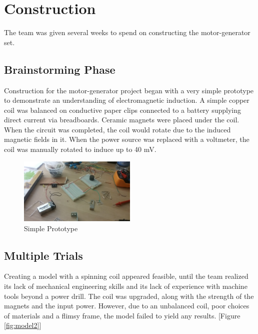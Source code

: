 \section{Construction}
The team was given several weeks to spend on constructing the motor-generator set.

    \subsection{Brainstorming Phase}
    Construction for the motor-generator project began with a very simple prototype to demonstrate an understanding of electromagnetic induction. A simple copper coil was balanced on conductive paper clips connected to a battery supplying direct current via breadboards. Ceramic magnets were placed under the coil. When the circuit was completed, the coil would rotate due to the induced magnetic fields in it. When the power source was replaced with a voltmeter, the coil was manually rotated to induce up to 40 mV.

    \begin{figure}[!ht]
        \begin{center}
            \includegraphics[width=0.5\textwidth]{figures/models/1.jpg}
        \end{center} \caption{Simple Prototype} \label{fig:model1}
    \end{figure}

    \subsection{Multiple Trials}
    Creating a model with a spinning coil appeared feasible, until the team realized its lack of mechanical engineering skills and its lack of experience with machine tools beyond a power drill. The coil was upgraded, along with the strength of the magnets and the input power. However, due to an unbalanced coil, poor choices of materials and a flimsy frame, the model failed to yield any results. [Figure \ref{fig:model2}]\\

